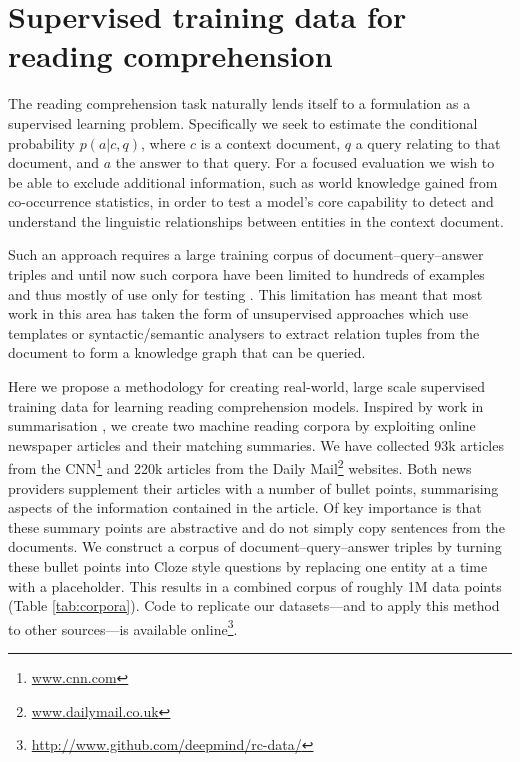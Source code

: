 \section{Supervised training data for reading comprehension}
\label{data}

The reading comprehension task naturally lends itself to a formulation as a
supervised learning problem. Specifically we seek to estimate the conditional
probability $p(a|c,q)$, where $c$ is a context document, $q$ a query relating to
that document, and $a$ the answer to that query.
For a focused evaluation we wish to be able to exclude additional information,
such as world knowledge gained from co-occurrence statistics, in order to test a
model's core capability to detect and understand the linguistic relationships
between entities in the context document.

Such an approach requires a large training corpus of document--query--answer
triples and until now such corpora have been limited to hundreds of examples and
thus mostly of use only for testing \cite{Richardson:2013:MCT}. This limitation
has meant that most work in this area has taken the form of unsupervised
approaches which use templates or syntactic/semantic analysers to extract
relation tuples from the document to form a knowledge graph that can be queried.

Here we propose a methodology for creating real-world, large scale supervised
training data for learning reading comprehension models. Inspired by work in
summarisation \cite{Svore:2007:CNN,Woodsend:2010:CNN}, we create two machine
reading corpora by exploiting online newspaper articles and their matching
summaries. We have collected 93k articles from the CNN\footnote{\url{www.cnn.com}} and 220k articles from
the Daily Mail\footnote{\url{www.dailymail.co.uk}} websites. Both news providers supplement their articles with a
number of bullet points, summarising aspects of the information contained in the
article. Of key importance is that these summary points are abstractive and do
not simply copy sentences from the documents.
We construct a corpus of document--query--answer triples by turning these
bullet points into Cloze \cite{Taylor:1953:CLOZE} style questions by replacing
one entity at a time with a placeholder. This results in a combined corpus of
roughly 1M data points (Table \ref{tab:corpora}).
Code to replicate our datasets---and to apply this method to other sources---is
available online\footnote{\url{http://www.github.com/deepmind/rc-data/}}.

